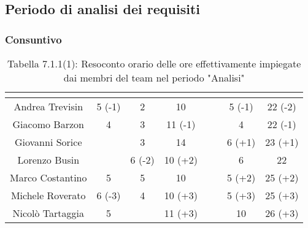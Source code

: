 \subsection{Periodo di analisi dei requisiti}
\subsubsection{Consuntivo}
\renewcommand{\arraystretch}{1.5}
\begin{table}[H]
\begin{center}
\begin{tabular}{|c|c|c|c|c|c|c|c|}
\hline
\rowcolor{title_row}
\textbf{\color{title_text}{Nome}} & \textbf{\color{title_text}{Resp.}} & \textbf{\color{title_text}{Ammi.}} & \textbf{\color{title_text}{Analist.}} & \textbf{\color{title_text}{Progett.}} & \textbf{\color{title_text}{Program.}} & \textbf{\color{title_text}{Verific.}} & \textbf{\color{title_text}{Totale}} \\ \hline
Andrea Trevisin  & 5 (-1) & 2 & 10 & & & 5 (-1) & 22 (-2)  \\ \hline
Giacomo Barzon   & 4 & 3 & 11 (-1) & & & 4 & 22 (-1)  \\ \hline
Giovanni Sorice  & & 3 & 14 & & & 6 (+1) & 23 (+1)  \\ \hline
Lorenzo Busin    & & 6 (-2) & 10 (+2) & & & 6 & 22  \\ \hline
Marco Costantino & 5 & 5 & 10 & & & 5 (+2) & 25 (+2) \\ \hline
Michele Roverato & 6 (-3) & 4 & 10 (+3) & & & 5 (+3) & 25 (+3) \\ \hline
Nicolò Tartaggia & 5 & & 11 (+3) & & & 10 & 26 (+3)  \\ \hline
\end{tabular}
\caption{Tabella 7.1.1(1): Resoconto orario delle ore effettivamente impiegate dai membri del team nel periodo "Analisi"\label{}}
\end{center}
\end{table}
\renewcommand{\arraystretch}{1}

